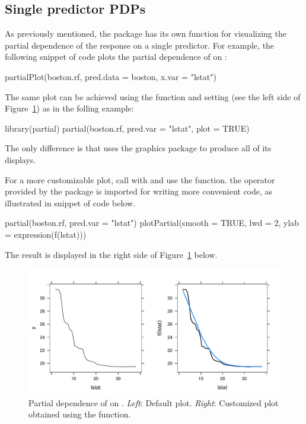 \subsection{Single predictor PDPs}

As previously mentioned, the  package has its own  function for visualizing the partial dependence of the response on a single predictor. For example, the following snippet of code plots the partial dependence of  on :
\begin{example}
partialPlot(boston.rf, pred.data = boston, x.var = "lstat")
\end{example}
The same plot can be achieved using the  function and setting  (see the left side of Figure~\ref{fig:pd_lstat}) as in the folling example:
\begin{example}
library(partial)
partial(boston.rf, pred.var = "lstat", plot = TRUE)
\end{example}
The only difference is that  uses the  graphics package to produce all of its displays.

For a more customizable plot, call  with  and use the  function.  the  operator provided by the  package \citep{magrittr-pkg} is imported for writing more convenient code, as illustrated in snippet of code below.
\begin{example}
partial(boston.rf, pred.var = "lstat") %
  plotPartial(smooth = TRUE, lwd = 2, ylab = expression(f(lstat)))
\end{example}
The result is displayed in the right side of Figure~\ref{fig:pd_lstat} below.

\begin{figure}[htbp]
  \centering
  \includegraphics[width=1.0\linewidth]{pd_lstat}
  \caption{Partial dependence of  on . \textit{Left}: Default plot. \textit{Right}: Customized plot obtained using the  function.}
  \label{fig:pd_lstat}
\end{figure}


